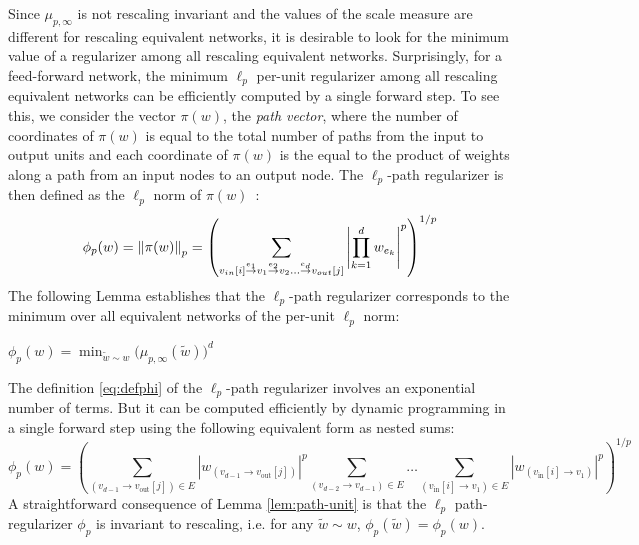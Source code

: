 \documentclass[11pt]{article}
\newcommand{\IN}{\text{in}}
\newcommand{\OUT}{\text{out}}
\newcommand{\vin}{v_{in}}
\newcommand{\vout}{v_{out}}
\begin{document}
Since $\mu_{p,\infty}$ is not rescaling invariant and the values of the
scale measure are different for rescaling equivalent networks, it is
desirable to look for the minimum value of a regularizer among all
rescaling equivalent networks. Surprisingly, for a feed-forward
network, the minimum $\ell_p$ per-unit regularizer among all rescaling
equivalent networks can be efficiently computed by a single forward
step. To see this, we consider the vector $\pi(w)$, the {\em path
  vector}, where the number of coordinates of $\pi(w)$ is equal to the
total number of paths from the input to output units and each
coordinate of $\pi(w)$ is the equal to the product of weights along a
path from an input nodes to an output node. The $\ell_p$-path
regularizer is then defined as the $\ell_p$ norm of
$\pi(w)$~\cite{neyshabur15}:
\begin{equation}\label{eq:defphi}
  \phi_p(w) = \norm{\pi(w)}_p = \left(\sum_{\vin[i] \overset{e_1}\rightarrow v_1\overset{e_2}\rightarrow v_2\dots\overset{e_d}{\rightarrow}\vout[j]} \left|\prod_{k=1}^d w_{e_k}\right|^p\right)^{1/p}
\end{equation}
The following Lemma establishes that the $\ell_p$-path regularizer
corresponds to the minimum over all equivalent networks of the
per-unit $\ell_p$ norm:
\begin{lem}\label{lem:path-unit}
$\displaystyle \phi_p(w) = \min_{\tilde{w} \sim w} \bigg(\mu_{p,\infty}(\tilde{w})\bigg)^d$
\end{lem}
The definition \eqref{eq:defphi} of the $\ell_p$-path regularizer
involves an exponential number of terms.  But it can be computed
efficiently by dynamic programming in a single forward step using the
following equivalent form as nested sums:
\begin{equation*}
\phi_p(w) = \left(\sum_{(v_{d-1}\rightarrow v_{\OUT}[j])\in E}\left| w_{(v_{d-1}\rightarrow v_{\OUT}[j])}\right|^p\sum_{(v_{d-2}\rightarrow v_{d-1})\in E}\dots \sum_{(v_{\IN}[i]\rightarrow v_{1})\in E} \left| w_{(v_{\IN}[i]\rightarrow v_{1})}\right|^p \right)^{1/p}
\end{equation*}
A straightforward consequence of Lemma \ref{lem:path-unit} is that the $\ell_p$ path-regularizer $\phi_p$ is invariant to rescaling, i.e. for any $\tilde{w} \sim w$, $\phi_p(\tilde{w})=\phi_p(w)$.
\end{document}
